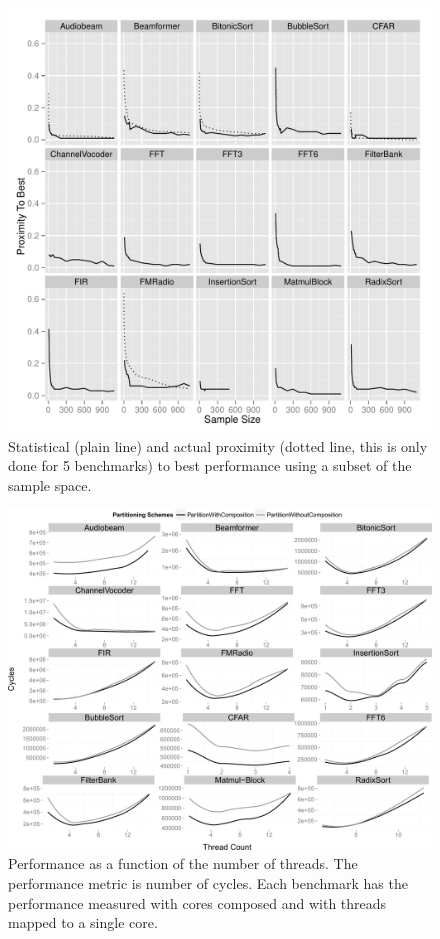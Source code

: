 \begin{figure}[t]
  \centering
    \includegraphics[width=1\textwidth]{streamit-paper/graphics/ESCProx.pdf}
    \caption{Statistical (plain line) and actual proximity (dotted line, this is only done for 5 benchmarks) to best performance using a subset of the sample space.}\label{fig:prox}
\end{figure}

\begin{figure}[t]
 \centering
    \includegraphics[width=1\textwidth]{streamit-paper/graphics/threadingmaybe2.pdf}
    \caption{Performance as a function of the number of threads. The performance metric is number of cycles. Each benchmark has the performance measured with cores composed and with threads mapped to a single core.}\label{fig:threadtrend}
\end{figure}

